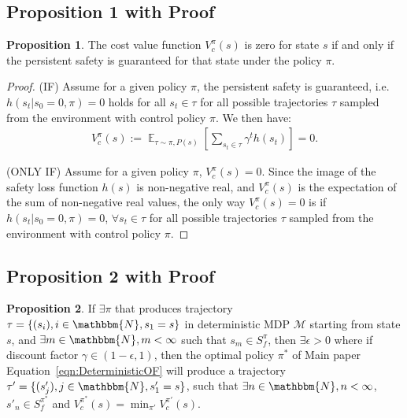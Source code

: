 \documentclass{article}
\theoremstyle{definition}
\DeclareMathOperator*{\E}{\mathbb{E}}
\newtheorem{prop}{Proposition}
\begin{document}
\subsection{Proposition 1 with Proof}
\begin{prop}
The cost value function $V_c^\pi (s)$ is zero for state $s$ if and only if the persistent safety is guaranteed for that state under the policy $\pi$. 
\end{prop}

\begin{proof}
    (IF) Assume for a given policy $\pi$, the persistent safety is guaranteed, i.e. $h(s_t|s_0 = 0, \pi) = 0$ holds for all $s_t \in \tau $ for all possible trajectories $\tau$ sampled from the environment with control policy $\pi$. We then have: 
    \begin{align*}
        V^\pi_c(s):=\E_{\tau \sim \pi,P(s)} [\sum\limits_{s_t\in \tau} \gamma^t h(s_t)] = 0.
    \end{align*}
    
    (ONLY IF) Assume for a given policy $\pi$, $V^\pi_c(s) = 0$. Since the image of the safety loss function $h(s)$ is non-negative real, and $V^\pi_c(s)$ is the expectation of the sum of non-negative real values, the only way $V^\pi_c(s) = 0$ is if $h(s_t|s_0 = 0, \pi) = 0$, $\forall s_t \in \tau $ for all possible trajectories $\tau$ sampled from the environment with control policy $\pi$. 
\end{proof}

\subsection{Proposition 2 with Proof}
\begin{prop}
    If $\exists\pi$ that produces trajectory $\tau=\{(s_i),i\in\mathbbm{N}, s_1=s\}$ in deterministic MDP $\mathcal{M}$ starting from state $s$, and $\exists m\in \mathbbm{N}, m<\infty$ such that $s_m\in S^\pi_f$, then $\exists \epsilon>0$ where if discount factor $\gamma\in (1-\epsilon,1)$, then the optimal policy $\pi^*$ of Main paper Equation~\ref{eqn:DeterministicOF} will produce a trajectory $\tau'=\{(s'_j),j\in\mathbbm{N}, s'_1=s\}$, such that $\exists n\in \mathbbm{N}, n<\infty$, $s'_n\in S^{\pi^*}_f$ and $V^{\pi^*}_c(s)=\min_{\pi'} V^{\pi'}_c(s)$.
\end{prop}
\end{document}

